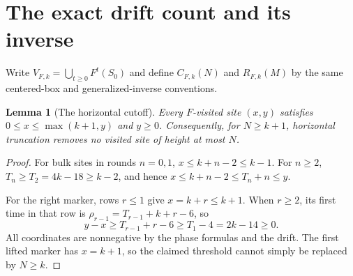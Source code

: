 \documentclass[11pt,letterpaper]{article}
\numberwithin{equation}{section}
\newtheorem{lemma}[theorem]{Lemma}
\theoremstyle{definition}
\theoremstyle{remark}
\begin{document}
\section{The exact drift count and its inverse}\label{smc:bp:sec:Fcount}
Write $V_{F,k}=\bigcup_{t\ge0}F^t(S_0)$ and define $C_{F,k}(N)$ and $R_{F,k}(M)$ by the same centered-box and generalized-inverse conventions.

\begin{lemma}[The horizontal cutoff]\label{smc:bp:lem:cutoff}
Every $F$-visited site $(x,y)$ satisfies $0\le x\le\max(k+1,y)$ and $y\ge0$. Consequently, for $N\ge k+1$, horizontal truncation removes no visited site of height at most $N$.
\end{lemma}
\begin{proof}
For bulk sites in rounds $n=0,1$, $x\le k+n-2\le k-1$. For $n\ge2$, $T_n\ge T_2=4k-18\ge k-2$, and hence $x\le k+n-2\le T_n+n\le y$.

For the right marker, rows $r\le1$ give $x=k+r\le k+1$. When $r\ge2$, its first time in that row is $\rho_{r-1}=T_{r-1}+k+r-6$, so
\[
y-x\ge T_{r-1}+r-6\ge T_1-4=2k-14\ge0.
\]
All coordinates are nonnegative by the phase formulas and the drift. The first lifted marker has $x=k+1$, so the claimed threshold cannot simply be replaced by $N\ge k$.
\end{proof}
\end{document}
